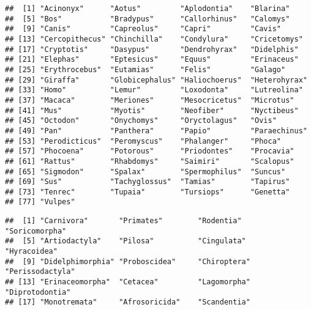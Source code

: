 \documentclass[
]{article}
\newenvironment{Shaded}{\begin{snugshade}}{\end{snugshade}}
\newcommand{\FunctionTok}[1]{\textcolor[rgb]{0.00,0.00,0.00}{#1}}
\newcommand{\NormalTok}[1]{#1}
\newcommand{\SpecialCharTok}[1]{\textcolor[rgb]{0.00,0.00,0.00}{#1}}
\begin{document}
\begin{Shaded}
\end{Shaded}

\begin{verbatim}
##  [1] "Acinonyx"      "Aotus"         "Aplodontia"    "Blarina"      
##  [5] "Bos"           "Bradypus"      "Callorhinus"   "Calomys"      
##  [9] "Canis"         "Capreolus"     "Capri"         "Cavis"        
## [13] "Cercopithecus" "Chinchilla"    "Condylura"     "Cricetomys"   
## [17] "Cryptotis"     "Dasypus"       "Dendrohyrax"   "Didelphis"    
## [21] "Elephas"       "Eptesicus"     "Equus"         "Erinaceus"    
## [25] "Erythrocebus"  "Eutamias"      "Felis"         "Galago"       
## [29] "Giraffa"       "Globicephalus" "Haliochoerus"  "Heterohyrax"  
## [33] "Homo"          "Lemur"         "Loxodonta"     "Lutreolina"   
## [37] "Macaca"        "Meriones"      "Mesocricetus"  "Microtus"     
## [41] "Mus"           "Myotis"        "Neofiber"      "Nyctibeus"    
## [45] "Octodon"       "Onychomys"     "Oryctolagus"   "Ovis"         
## [49] "Pan"           "Panthera"      "Papio"         "Paraechinus"  
## [53] "Perodicticus"  "Peromyscus"    "Phalanger"     "Phoca"        
## [57] "Phocoena"      "Potorous"      "Priodontes"    "Procavia"     
## [61] "Rattus"        "Rhabdomys"     "Saimiri"       "Scalopus"     
## [65] "Sigmodon"      "Spalax"        "Spermophilus"  "Suncus"       
## [69] "Sus"           "Tachyglossus"  "Tamias"        "Tapirus"      
## [73] "Tenrec"        "Tupaia"        "Tursiops"      "Genetta"      
## [77] "Vulpes"
\end{verbatim}

\begin{Shaded}
\end{Shaded}

\begin{verbatim}
##  [1] "Carnivora"       "Primates"        "Rodentia"        "Soricomorpha"   
##  [5] "Artiodactyla"    "Pilosa"          "Cingulata"       "Hyracoidea"     
##  [9] "Didelphimorphia" "Proboscidea"     "Chiroptera"      "Perissodactyla" 
## [13] "Erinaceomorpha"  "Cetacea"         "Lagomorpha"      "Diprotodontia"  
## [17] "Monotremata"     "Afrosoricida"    "Scandentia"
\end{verbatim}
\end{document}
